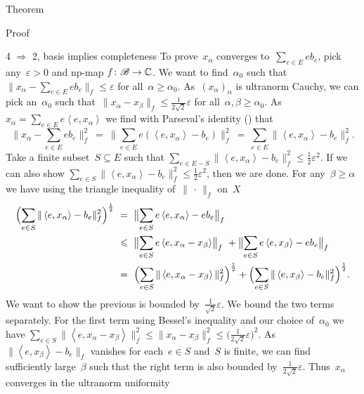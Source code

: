 \documentclass[b]{subfiles}
\begin{document}
\begin{parsec}
\begin{point}{Theorem}
\begin{point}{Proof}
\begin{point}{4 $\Rightarrow$ 2, basis implies completeness}
To prove~$x_\alpha$ converges to~$\sum_{e \in E} e b_e$,
    pick any~$\varepsilon > 0$
        and np-map $f\colon \scrB \to \C$.
We want to find~$\alpha_0$
    such that~$\| x_\alpha - \sum_{e \in E} e b_e\|_f \leq \varepsilon$
        for all~$\alpha \geq \alpha_0$.
As~$(x_\alpha)_\alpha$ is ultranorm Cauchy,
we can pick an~$\alpha_0$
such that~$\| x_\alpha - x_\beta \|_f \leq \frac{1}{2\sqrt{2}} \varepsilon$
for all~$\alpha,\beta \geq \alpha_0$.
As~$x_\alpha = \sum_{e \in E} e \left<e,x_\alpha\right>$
we find with Parseval's identity () that
\begin{equation*}
    \bigl\| x_\alpha - \sum_{e \in E} eb_e \bigr\|_f^2
    \ =\  \bigl\| \sum_{e \in E} e(\left<e, x_\alpha\right> - b_e) \bigr\|_f^2
    \ =\  \sum_{e \in E}\| \left<e, x_\alpha\right> - b_e \|_f^2.
\end{equation*}
Take a finite subset~$S \subseteq E$
such that
    $\sum_{e \in E - S}\| \left<e, x_\alpha\right> - b_e \|_f^2 \leq
        \frac{1}{2}\varepsilon^2$.
If we can also show
    $\sum_{e \in  S}\| \left<e, x_\alpha\right> - b_e \|_f^2 \leq
        \frac{1}{2}\varepsilon^2$,
        then we are done.
For any~$\beta \geq \alpha$
    we have using the triangle inequality of~$\|\,\cdot\,\|_f$
        on~$X$
\begin{align*}
    \Bigl(\sum_{e \in S}\| \left<e, x_\alpha\right>
        - b_e \|_f^2\Bigr)^{\frac{1}{2}}
        &\ =\  \bigl\|\sum_{e \in S} e\left<e, x_\alpha\right> - eb_e \bigr\|_f\\
        &\ \leq\  \bigl\|\sum_{e \in S} e\left<e, x_\alpha-x_\beta\right> \bigr\|_f\
        +\bigl\|\sum_{e \in S} e\left<e, x_\beta\right> - eb_e \bigr\|_f\\
        &\ =\  \Bigl( \sum_{e \in S}\|\left<e, x_\alpha-x_\beta\right> \|_f^2 \Bigr)^{\frac{1}{2}}
        +\Bigl(\sum_{e \in S}\| \left<e, x_\beta\right> - b_e \|_f^2
        \Bigr)^{\frac{1}{2}}.
\end{align*}
We want to show the previous is bounded by~$\frac{1}{\sqrt{2}}\varepsilon$.
We bound the two terms separately.
For the first term using Bessel's
inequality and our choice of~$\alpha_0$
we have
$\sum_{e \in S}\|\left<e, x_\alpha-x_\beta\right> \|_f^2 
\leq \|x_\alpha - x_\beta\|^2_f \leq \bigl(\frac{1}{2\sqrt{2}}\varepsilon\bigr)^2.$
As~$\|\left<e,x_\beta\right> - b_e\|_f$
vanishes for each~$e \in S$ and~$S$ is finite,
we can find sufficiently large~$\beta$
such that the right term is also bounded by~$\frac{1}{2\sqrt{2}}\varepsilon$.
Thus~$x_\alpha$ converges in the ultranorm uniformity

\end{point}
\end{point}
\end{point}
\end{parsec}
\end{document}
